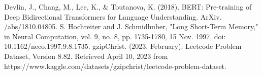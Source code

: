 \documentclass{article}
\begin{document}
\small

\begin{thebibliography}{9}
Devlin, J., Chang, M., Lee, K., \& Toutanova, K. (2018). BERT: Pre-training of Deep Bidirectional Transformers for Language Understanding. ArXiv. /abs/1810.04805.
S. Hochreiter and J. Schmidhuber, "Long Short-Term Memory," in Neural Computation, vol. 9, no. 8, pp. 1735-1780, 15 Nov. 1997, doi: 10.1162/neco.1997.9.8.1735.
gzipChrist. (2023, February). Leetcode Problem Dataset, Version 8.82. Retrieved April 10, 2023 from https://www.kaggle.com/datasets/gzipchrist/leetcode-problem-dataset.
\end{thebibliography}


%
%
%
\end{document}
